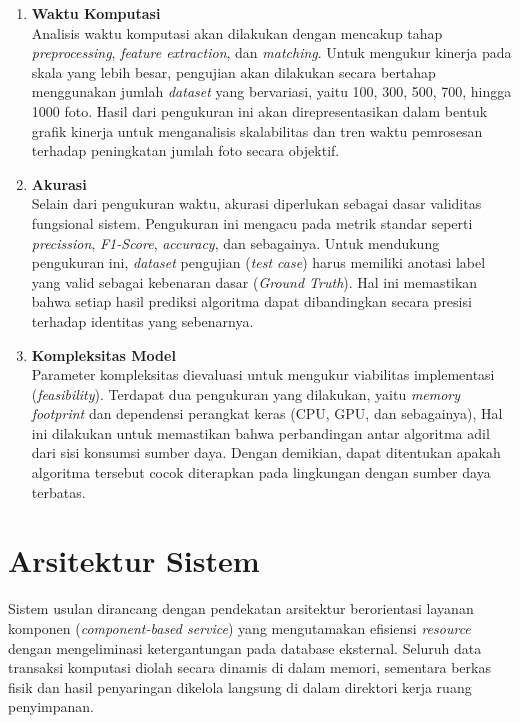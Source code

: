 \begin{enumerate}
  \item \textbf{Waktu Komputasi} \\
  Analisis waktu komputasi akan dilakukan dengan mencakup tahap \textit{preprocessing}, \textit{feature extraction}, dan \textit{matching}. Untuk mengukur kinerja pada skala yang lebih besar, pengujian akan dilakukan secara bertahap menggunakan jumlah \textit{dataset} yang bervariasi, yaitu 100, 300, 500, 700, hingga 1000 foto. Hasil dari pengukuran ini akan direpresentasikan dalam bentuk grafik kinerja untuk menganalisis skalabilitas dan tren waktu pemrosesan terhadap peningkatan jumlah foto secara objektif.
  
  \item \textbf{Akurasi} \\
  Selain dari pengukuran waktu, akurasi diperlukan sebagai dasar validitas fungsional sistem. Pengukuran ini mengacu pada metrik standar seperti \textit{precission}, \textit{F1-Score}, \textit{accuracy}, dan sebagainya. Untuk mendukung pengukuran ini, \textit{dataset} pengujian (\textit{test case}) harus memiliki anotasi label yang valid sebagai kebenaran dasar (\textit{Ground Truth}). Hal ini memastikan bahwa setiap hasil prediksi algoritma dapat dibandingkan secara presisi terhadap identitas yang sebenarnya.
  
  \item \textbf{Kompleksitas Model} \\
  Parameter kompleksitas dievaluasi untuk mengukur viabilitas implementasi (\textit{feasibility}). Terdapat dua pengukuran yang dilakukan, yaitu \textit{memory footprint} dan dependensi perangkat keras (CPU, GPU, dan sebagainya), Hal ini dilakukan untuk memastikan bahwa perbandingan antar algoritma adil dari sisi konsumsi sumber daya. Dengan demikian, dapat ditentukan apakah algoritma tersebut cocok diterapkan pada lingkungan dengan sumber daya terbatas.

\end{enumerate}

\section{Arsitektur Sistem}

Sistem usulan dirancang dengan pendekatan arsitektur berorientasi layanan komponen (\textit{component-based service}) yang mengutamakan efisiensi \textit{resource} dengan mengeliminasi ketergantungan pada database eksternal. Seluruh data transaksi komputasi diolah secara dinamis di dalam memori, sementara berkas fisik dan hasil penyaringan dikelola langsung di dalam direktori kerja ruang penyimpanan.

